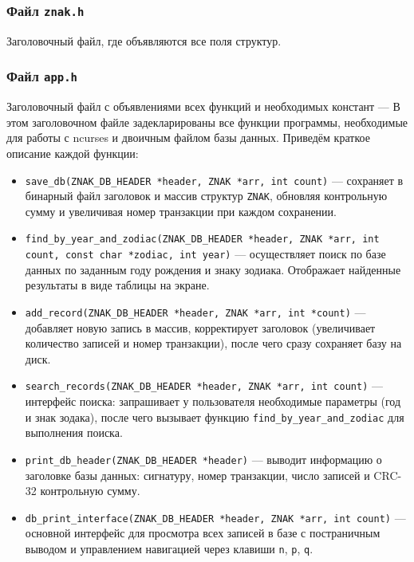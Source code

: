 \subsubsection*{Файл \texttt{znak.h}}

\noindent
Заголовочный файл, где объявляются все поля структур. 

\subsubsection*{Файл \texttt{app.h}}

Заголовочный файл с объявлениями всех функций и необходимых констант --- В этом заголовочном файле задекларированы все функции программы, необходимые для работы с ncurses и двоичным файлом базы данных. Приведём краткое описание каждой функции:
\begin{itemize}
  \item \texttt{save\_db(ZNAK\_DB\_HEADER *header, ZNAK *arr, int count)} — сохраняет в бинарный файл заголовок и массив структур \texttt{ZNAK}, обновляя контрольную сумму и увеличивая номер транзакции при каждом сохранении.
  
  \item \texttt{find\_by\_year\_and\_zodiac(ZNAK\_DB\_HEADER *header, 
  ZNAK *arr, int count, const char *zodiac, int year)} — осуществляет поиск по базе данных по заданным году рождения и знаку зодиака. Отображает найденные результаты в виде таблицы на экране.
  
  \item \texttt{add\_record(ZNAK\_DB\_HEADER *header, ZNAK *arr, int *count)} — добавляет новую запись в массив, корректирует заголовок (увеличивает количество записей и номер транзакции), после чего сразу сохраняет базу на диск.
  
  \item \texttt{search\_records(ZNAK\_DB\_HEADER *header, ZNAK *arr, int count)} — интерфейс поиска: запрашивает у пользователя необходимые параметры (год и знак зодака), после чего вызывает функцию \break\texttt{find\_by\_year\_and\_zodiac} для выполнения поиска.
  
  \item \texttt{print\_db\_header(ZNAK\_DB\_HEADER *header)} — выводит информацию о заголовке базы данных: сигнатуру, номер транзакции, число записей и CRC-32 контрольную сумму.
  
  \item \texttt{db\_print\_interface(ZNAK\_DB\_HEADER *header, ZNAK *arr, int count)} — основной интерфейс для просмотра всех записей в базе с постраничным выводом и управлением навигацией через клавиши \texttt{n}, \texttt{p}, \texttt{q}.
  

\end{itemize}
